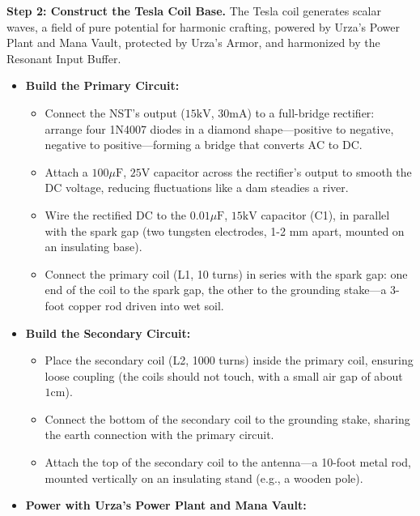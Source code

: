 \textbf{Step 2: Construct the Tesla Coil Base.} The Tesla coil generates scalar waves, a field of pure potential for harmonic crafting, powered by Urza's Power Plant and Mana Vault, protected by Urza's Armor, and harmonized by the Resonant Input Buffer.
\begin{itemize}
    \item \texttt{} \textbf{Build the Primary Circuit:}
    \begin{itemize}
        \item \texttt{} Connect the NST's output ($15 \mathrm{kV}$, $30 \mathrm{mA}$) to a full-bridge rectifier: arrange four 1N4007 diodes in a diamond shape—positive to negative, negative to positive—forming a bridge that converts $\mathrm{AC}$ to $\mathrm{DC}$.
        \item \texttt{} Attach a $100 \mu\mathrm{F}$, $25 \mathrm{V}$ capacitor across the rectifier's output to smooth the DC voltage, reducing fluctuations like a dam steadies a river.
        \item \texttt{} Wire the rectified DC to the $0.01 \mu\mathrm{F}$, $15 \mathrm{kV}$ capacitor (C1), in parallel with the spark gap (two tungsten electrodes, 1-2 mm apart, mounted on an insulating base).
        \item \texttt{} Connect the primary coil (L1, 10 turns) in series with the spark gap: one end of the coil to the spark gap, the other to the grounding stake—a 3-foot copper rod driven into wet soil.
    \end{itemize}
    \item \texttt{} \textbf{Build the Secondary Circuit:}
    \begin{itemize}
        \item \texttt{} Place the secondary coil (L2, 1000 turns) inside the primary coil, ensuring loose coupling (the coils should not touch, with a small air gap of about $1 \mathrm{cm}$).
        \item \texttt{} Connect the bottom of the secondary coil to the grounding stake, sharing the earth connection with the primary circuit.
        \item \texttt{} Attach the top of the secondary coil to the antenna—a 10-foot metal rod, mounted vertically on an insulating stand (e.g., a wooden pole).
    \end{itemize}
    \item \texttt{} \textbf{Power with Urza's Power Plant and Mana Vault:}
    \begin{itemize}

\end{itemize}
\end{itemize}

